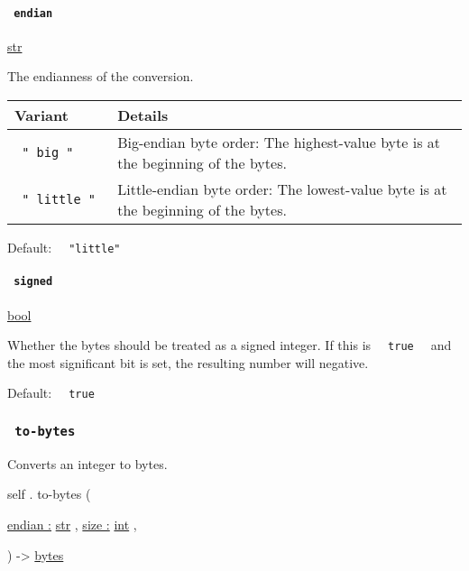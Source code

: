 \paragraph{\texorpdfstring{\texttt{\ endian\ }}{ endian }}\label{definitions-from-bytes-endian}

\href{/docs/reference/foundations/str/}{str}

The endianness of the conversion.

\begin{longtable}[]{@{}ll@{}}
\toprule\noalign{}
Variant & Details \\
\midrule\noalign{}
\endhead
\bottomrule\noalign{}
\endlastfoot
\texttt{\ "\ big\ "\ } & Big-endian byte order: The highest-value byte
is at the beginning of the bytes. \\
\texttt{\ "\ little\ "\ } & Little-endian byte order: The lowest-value
byte is at the beginning of the bytes. \\
\end{longtable}

Default: \texttt{\ }{\texttt{\ "little"\ }}\texttt{\ }

\paragraph{\texorpdfstring{\texttt{\ signed\ }}{ signed }}\label{definitions-from-bytes-signed}

\href{/docs/reference/foundations/bool/}{bool}

Whether the bytes should be treated as a signed integer. If this is
\texttt{\ }{\texttt{\ true\ }}\texttt{\ } and the most significant bit
is set, the resulting number will negative.

Default: \texttt{\ }{\texttt{\ true\ }}\texttt{\ }

\subsubsection{\texorpdfstring{\texttt{\ to-bytes\ }}{ to-bytes }}\label{definitions-to-bytes}

Converts an integer to bytes.

self { . } { to-bytes } (

{ \hyperref[definitions-to-bytes-parameters-endian]{endian :}
\href{/docs/reference/foundations/str/}{str} , } {
\hyperref[definitions-to-bytes-parameters-size]{size :}
\href{/docs/reference/foundations/int/}{int} , }

) -\textgreater{} \href{/docs/reference/foundations/bytes/}{bytes}

